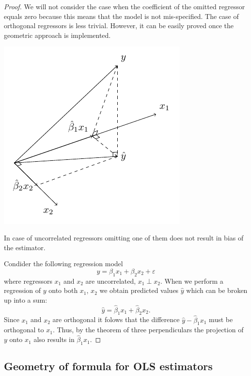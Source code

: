 \begin{proof}
We will not consider the case when the coefficient of the omitted regressor
equals zero because this means that the model is not mis-specified.
The case of orthogonal regressors is less trivial.
However, it can be easily proved once the geometric approach is implemented.

\begin{marginfigure}
\includegraphics[scale=0.7]{figures/02_uncorrelated_regressors.pdf}
\label{fig:uncorrelated_regressors}
\caption{In case of uncorrelated regressors omitting one of them
does not result in bias of the estimator.}
\end{marginfigure}

Condider the following regression model
\[
y = \beta_1 x_1 + \beta_2 x_2 + \varepsilon
\]
where regressors $x_1$ and $x_2$ are uncorrelated, $x_1 \perp x_2$.
When we perform a regression of $y$ onto both $x_1$, $x_2$
we obtain predicted values $\hat y$ which can be broken up into a sum:
\[
\hat y = \hat \beta_1 x_1 + \hat \beta_2 x_2.
\]
Since $x_1$ and $x_2$ are orthogonal it folows that
the difference $\hat y - \hat \beta_1 x_1$ must be orthogonal to $x_1$.
Thus, by the theorem of three perpendiculars the projection of $y$ onto
$x_1$ also results in $\hat \beta_1 x_1$.
\end{proof}

\vspace{3cm}
\subsection{Geometry of formula for OLS estimators}

